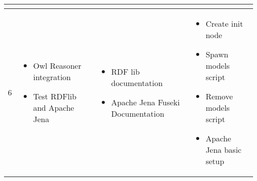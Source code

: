\begin{center}
\begin{tabular}{ | l | p{4cm} | p{4cm} | p{5cm} |}
\begin{itemize}
     \end{itemize}  \\
    \hline
    6 & \begin{itemize}
     \item Owl Reasoner integration
     \item Test RDFlib and Apache Jena
     \end{itemize} 
     & \begin{itemize}
     \item RDF lib documentation
     \item Apache Jena Fuseki Documentation \cite{bib15}
     \end{itemize} 
      & \begin{itemize}
     \item Create init node
     \item Spawn models script
     \item Remove models script
     \item Apache Jena basic setup
    \end{itemize}  \\
    \hline
    \end{tabular}
\end{center}


